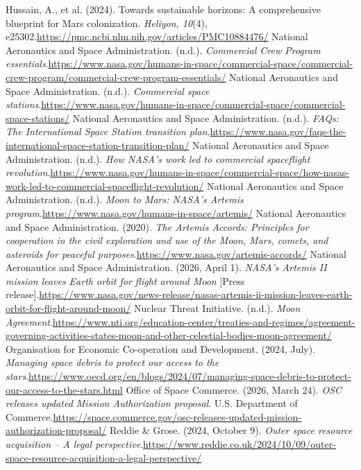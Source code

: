 \begin{referencelist}
   Hussain, A., et al. (2024). Towards sustainable horizons: A comprehensive blueprint for Mars colonization. \emph{Heliyon, 10}(4), e25302.\url{https://pmc.ncbi.nlm.nih.gov/articles/PMC10884476/}
   National Aeronautics and Space Administration. (n.d.). \emph{Commercial Crew Program essentials}.\url{https://www.nasa.gov/humans-in-space/commercial-space/commercial-crew-program/commercial-crew-program-essentials/}
   National Aeronautics and Space Administration. (n.d.). \emph{Commercial space stations}.\url{https://www.nasa.gov/humans-in-space/commercial-space/commercial-space-stations/}
   National Aeronautics and Space Administration. (n.d.). \emph{FAQs: The International Space Station transition plan}.\url{https://www.nasa.gov/faqs-the-international-space-station-transition-plan/}
   National Aeronautics and Space Administration. (n.d.). \emph{How NASA's work led to commercial spaceflight revolution}.\url{https://www.nasa.gov/humans-in-space/commercial-space/how-nasas-work-led-to-commercial-spaceflight-revolution/}
   National Aeronautics and Space Administration. (n.d.). \emph{Moon to Mars: NASA's Artemis program}.\url{https://www.nasa.gov/humans-in-space/artemis/}
   National Aeronautics and Space Administration. (2020). \emph{The Artemis Accords: Principles for cooperation in the civil exploration and use of the Moon, Mars, comets, and asteroids for peaceful purposes}.\url{https://www.nasa.gov/artemis-accords/}
   National Aeronautics and Space Administration. (2026, April 1). \emph{NASA's Artemis II mission leaves Earth orbit for flight around Moon} [Press release].\url{https://www.nasa.gov/news-release/nasas-artemis-ii-mission-leaves-earth-orbit-for-flight-around-moon/}
   Nuclear Threat Initiative. (n.d.). \emph{Moon Agreement}.\url{https://www.nti.org/education-center/treaties-and-regimes/agreement-governing-activities-states-moon-and-other-celestial-bodies-moon-agreement/}
   Organisation for Economic Co-operation and Development. (2024, July). \emph{Managing space debris to protect our access to the stars}.\url{https://www.oecd.org/en/blogs/2024/07/managing-space-debris-to-protect-our-access-to-the-stars.html}
   Office of Space Commerce. (2026, March 24). \emph{OSC releases updated Mission Authorization proposal}. U.S. Department of Commerce.\url{https://space.commerce.gov/osc-releases-updated-mission-authorization-proposal/}
   Reddie \& Grose. (2024, October 9). \emph{Outer space resource acquisition – A legal perspective}.\url{https://www.reddie.co.uk/2024/10/09/outer-space-resource-acquisition-a-legal-perspective/}

\end{referencelist}
